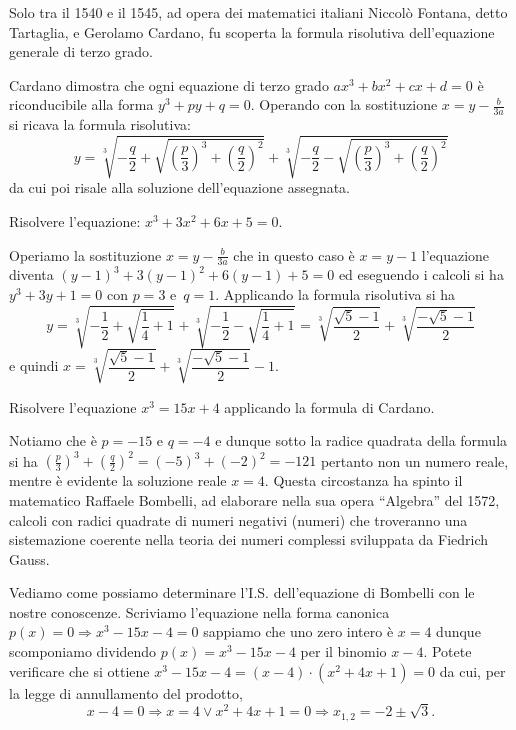 Solo tra il 1540 e il 1545, ad opera dei matematici italiani Niccolò Fontana, 
detto Tartaglia, e Gerolamo Cardano, fu scoperta la formula risolutiva 
dell'equazione generale di terzo grado.

Cardano dimostra che ogni equazione di terzo grado $ax^3+bx^2+cx+d=0$ è 
riconducibile alla forma $y^3+{py}+q=0$. Operando con la sostituzione $x=y-\frac 
b{3a}$ si ricava la formula risolutiva: 
\[y=\sqrt[3]{-\frac q 2+\sqrt{\left(\frac p 3\right)^3+\left(\frac q 
2\right)^2}}+\sqrt[3]{-\frac q 2-\sqrt{\left(\frac p 3\right)^3+\left(\frac q 
2\right)^2}}\] 
da cui poi risale alla soluzione dell'equazione assegnata.
\begin{exrig}
\begin{esempio}
Risolvere l'equazione: $x^3+3x^2+6x+5=0$.

Operiamo la sostituzione $x=y-\frac b{3a}$ che in questo caso è $x=y-1$ 
l'equazione diventa $(y-1)^3+3(y-1)^2+6(y-1)+5=0$ ed eseguendo i calcoli si ha 
$y^3+3y+1=0$ con $p=3$ e~$q=1$.
Applicando la formula risolutiva si ha 
\[y=\sqrt[3]{-\frac 1 2+\sqrt{\frac 1 4+1}}+\sqrt[3]{-\frac 1 2-\sqrt{\frac 1 
4+1}}=\sqrt[3]{\frac{\sqrt 5-1} 2}+\sqrt[3]{\frac{-\sqrt 5-1} 2}\] 
e quindi $x=\sqrt[3]{\dfrac{\sqrt 5-1} 2}+\sqrt[3]{\dfrac{-\sqrt 5-1} 2}-1$.
\end{esempio}

\begin{esempio}
Risolvere l'equazione $x^3=15x+4$ applicando la formula di Cardano.

Notiamo che è $p=-15$ e $q=-4$ e dunque sotto la radice quadrata della formula 
si ha $\left(\frac p 3\right)^3+\left(\frac q 2\right)^2=(-5)^3+(-2)^2=-121$ 
pertanto non un numero
reale, mentre è evidente la soluzione reale $x=4$. Questa circostanza ha spinto 
il 
matematico Raffaele Bombelli, ad elaborare nella sua opera ``Algebra'' del 1572, 
calcoli con radici 
quadrate di numeri negativi (numeri) che troveranno una sistemazione coerente 
nella teoria dei 
numeri complessi sviluppata da Fiedrich Gauss.

Vediamo come possiamo determinare l'I.S. dell'equazione di Bombelli con le 
nostre conoscenze. Scriviamo l'equazione nella forma canonica $p(x)=0\Rightarrow 
x^3-15x-4=0$ sappiamo che uno zero intero è $x=4$ dunque scomponiamo dividendo 
$p(x)=x^3-15x-4$ per il binomio $x-4$. Potete verificare che si ottiene 
$x^3-15x-4=(x-4)\cdot (x^2+4x+1)=0$ da cui, per la legge di annullamento del 
prodotto, 
\[x-4=0\Rightarrow x=4\vee x^2+4x+1=0\Rightarrow x_{1,2}=-2\pm \sqrt 3.\]


\end{esempio}
\end{exrig}
